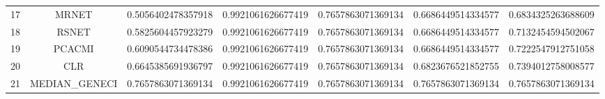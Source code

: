 \documentclass[a4paper,10pt]{article}
\begin{document}
\begin{landscape}
\begin{table}[!htp]
\begin{tabular}{ccccccc}
17&MRNET&0.5056402478357918&0.9921061626677419&0.7657863071369134&0.6686449514334577&0.6834325263688609\\
18&RSNET&0.5825604457923279&0.9921061626677419&0.7657863071369134&0.6686449514334577&0.7132454594502067\\
19&PCACMI&0.6090544734478386&0.9921061626677419&0.7657863071369134&0.6686449514334577&0.7222547912751058\\
20&CLR&0.6645385691936797&0.9921061626677419&0.7657863071369134&0.6823676521852755&0.7394012758008577\\
21&MEDIAN_GENECI&0.7657863071369134&0.9921061626677419&0.7657863071369134&0.7657863071369134&0.7657863071369134\\
\hline
\end{tabular}
\end{table}

\end{landscape}
\end{document}
